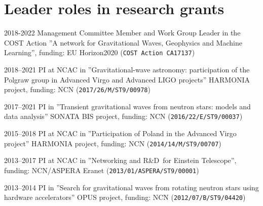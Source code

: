 \documentclass[]{friggeri-cv} %
\begin{document}
% 
\vskip 0.5cm 
\section{Leader roles in research grants} 
\begin{entrylistoc}

\entrys 
{2018-2022} 
{Management Committee Member and Work Group Leader in the COST Action ''A network for Gravitational Waves, Geophysics and Machine Learning'', funding: EU Horizon2020 ({\tt COST Action CA17137}) } 
   
\entrys
{2018--2021}
{PI at NCAC in ''Gravitational-wave astronomy: participation of the Polgraw group in Advanced Virgo and Advanced LIGO projects'' HARMONIA project, funding: NCN ({\tt 2017/26/M/ST9/00978})}

\entrys
{2017--2021} 
{PI in ''Transient gravitational waves from neutron stars: models and data analysis'' SONATA BIS project, funding: NCN ({\tt 2016/22/E/ST9/00037})} 

\entrys
{2015--2018} 
{PI at NCAC in ''Participation of Poland in the Advanced Virgo project'' HARMONIA project, funding: NCN ({\tt 2014/14/M/ST9/00707})} 

\entrys
{2013--2017}
{PI at NCAC in ''Networking and R\&D for Einstein Telescope'', funding: NCN/ASPERA Eranet ({\tt 2013/01/ASPERA/ST9/00001})}

\entrys
{2013--2014}
{PI in ''Search for gravitational waves from rotating neutron stars using hardware accelerators'' OPUS project, funding: NCN ({\tt 2012/07/B/ST9/04420})} 

\end{entrylistoc}


\end{document}
